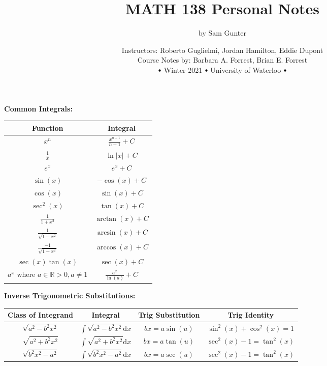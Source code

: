 \documentclass[11pt,notitlepage]{report}
\newcommand\sbullet[1][.75]{\mathbin{\vcenter{\hbox{\scalebox{#1}{$\bullet$}}}}}
\begin{document}
\parindent=0pt


\title{\vspace{-15mm}MATH 138 Personal Notes \vspace{-5mm}}
\author{by Sam Gunter}
\date{Instructors: Roberto Guglielmi, Jordan Hamilton, Eddie Dupont\\ 
Course Notes by: Barbara A. Forrest, Brian E. Forrest\\
$\sbullet$ Winter 2021 $\sbullet$ University of Waterloo $\sbullet$}
\maketitle

\textbf{Common Integrals:}
\renewcommand{\arraystretch}{1.5}
\begin{center}
\begin{tabular}{ | c | c | } 
\hline
 Function & Integral \\ 
\hline
 $x^n$ & $\frac{x^{n+1}}{n+1} + C$ \\ 
\hline
 $\frac{1}{x}$ & $\ln{|x|} + C$ \\ 
\hline
 $e^x$ & $e^x + C$ \\ 
\hline
 $\sin{(x)}$ & $-\cos{(x)} + C$ \\ 
\hline
 $\cos{(x)}$ & $\sin{(x)} + C$ \\ 
\hline
 $\sec^2{(x)}$ & $\tan{(x)} + C$ \\ 
\hline
 $\frac{1}{1+x^2}$ & $\arctan{(x)} + C$ \\ 
\hline
 $\frac{1}{\sqrt{1-x^2}}$ & $\arcsin{(x)} + C$ \\ 
\hline
 $\frac{-1}{\sqrt{1-x^2}}$ & $\arccos{(x)} + C$ \\ 
\hline
 $\sec{(x)}\tan{(x)}$ & $\sec{(x)} + C$ \\ 
\hline
 $a^x \text{ where } a \in \mathbb R > 0, a \ne 1$ & $\frac{a^x}{\ln{(a)}} + C$ \\ 
\hline
\end{tabular}
\end{center}
\renewcommand{\arraystretch}{1}

\textbf{Inverse Trigonometric Substitutions:}
\renewcommand{\arraystretch}{1.35}
\begin{center}
\begin{tabular}{ | c | c | c | c | } 
\hline
Class of Integrand & Integral & Trig Substitution & Trig Identity \\ 
\hline
$\sqrt{a^2-b^2x^2}$ & $\int \sqrt{a^2-b^2x^2} \mathrm{d}x$ & $bx = a \sin{(u)}$ & $\sin^2{(x)} + \cos^2{(x)} = 1$ \\ 
\hline
$\sqrt{a^2+b^2x^2}$ & $\int \sqrt{a^2+b^2x^2} \mathrm{d}x$ & $bx = a \tan{(u)}$ & $\sec^2{(x)} - 1 = \tan^2{(x)}$ \\ 
\hline
$\sqrt{b^2x^2-a^2}$ & $\int \sqrt{b^2x^2-a^2} \mathrm{d}x$ & $bx = a \sec{(u)}$ & $\sec^2{(x)} - 1 = \tan^2{(x)}$ \\ 
\hline
\end{tabular}
\end{center}
\renewcommand{\arraystretch}{1}
\end{document}
